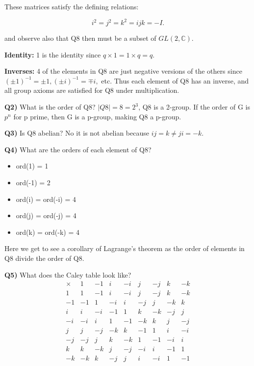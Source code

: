 \documentclass[12pt]{article}
\begin{document}
\noindent 
These matrices satisfy the defining relations:

\[
i^2 = j^2 = k^2 = ijk = -I.
\]

\noindent 
and observe also that Q8 then must be a subset of \(GL(2, \mathbb C)\).

\noindent 
\textbf{Identity:} 1 is the identity since \(q \times 1 = 1 \times q = q\). 

\noindent 
\textbf{Inverses:} 4 of the elements in Q8 are just negative versions of the others since 
\((\pm 1)^{-1} = \pm 1, (\pm i)^{-1} = \mp i,\) etc. Thus each element of Q8 has an inverse, and all group axioms are satisfied for Q8 under multiplication. 

\noindent 
\textbf{Q2)} What is the order of Q8? \(|Q8| = 8 = 2^3\), Q8 is a 2-group. If the order 
of G is \(p^n\) for p prime, then G is a p-group, making Q8 a p-group.

\noindent 
\textbf{Q3)} Is Q8 abelian? No it is not abelian because \(ij = k \neq ji = -k\). 

\noindent
\textbf{Q4)} What are the orders of each element of Q8? 

\begin{itemize}
    \item ord(1) = 1 
    \item ord(-1) = 2
    \item ord(i) = ord(-i) = 4 
    \item ord(j) = ord(-j) = 4 
    \item ord(k) = ord(-k) = 4
\end{itemize}

\noindent 
Here we get to see a corollary of Lagrange's theorem as the order of elements in Q8 
divide the order of Q8.

\noindent 
\textbf{Q5)} What does the Caley table look like?  
\[
\begin{array}{c|cccccccc}
    \times & 1 & -1 & i & -i & j & -j & k & -k \\
    \hline
    1  & 1  & -1  & i  & -i  & j  & -j  & k  & -k  \\
    -1 & -1 & 1   & -i & i   & -j & j   & -k & k   \\
    i  & i  & -i  & -1 & 1   & k  & -k  & -j & j   \\
    -i & -i & i   & 1  & -1  & -k & k   & j  & -j  \\
    j  & j  & -j  & -k & k   & -1 & 1   & i  & -i  \\
    -j & -j & j   & k  & -k  & 1  & -1  & -i & i   \\
    k  & k  & -k  & j  & -j  & -i & i   & -1 & 1   \\
    -k & -k & k   & -j & j   & i  & -i  & 1  & -1  
\end{array}
\]
\end{document}
